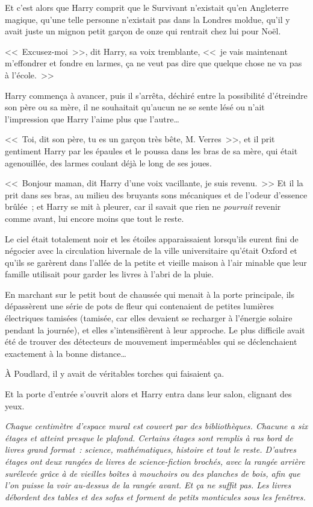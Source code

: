 Et c'est alors que Harry comprit que le Survivant n'existait qu'en Angleterre magique, qu'une telle personne n'existait pas dans la Londres moldue, qu'il y avait juste un mignon petit garçon de onze qui rentrait chez lui pour Noël.

<<~Excusez-moi~>>, dit Harry, sa voix tremblante, <<~je vais maintenant m'effondrer et fondre en larmes, ça ne veut pas dire que quelque chose ne va pas à l'école.~>>

Harry commença à avancer, puis il s'arrêta, déchiré entre la possibilité d'étreindre son père ou sa mère, il ne souhaitait qu'aucun ne se sente lésé ou n'ait l'impression que Harry l'aime plus que l'autre…

<<~Toi, dit son père, tu es un garçon très bête, M. Verres~>>, et il prit gentiment Harry par les épaules et le poussa dans les bras de sa mère, qui était agenouillée, des larmes coulant déjà le long de ses joues.

<<~Bonjour maman, dit Harry d'une voix vacillante, je suis revenu.~>> Et il la prit dans ses bras, au milieu des bruyants sons mécaniques et de l'odeur d'essence brûlée~; et Harry se mit à pleurer, car il savait que rien ne \emph{pourrait} revenir comme avant, lui encore moins que tout le reste.

\later

Le ciel était totalement noir et les étoiles apparaissaient lorsqu'ils eurent fini de négocier avec la circulation hivernale de la ville universitaire qu'était Oxford et qu'ils se garèrent dans l'allée de la petite et vieille maison à l'air minable que leur famille utilisait pour garder les livres à l'abri de la pluie.

En marchant sur le petit bout de chaussée qui menait à la porte principale, ils dépassèrent une série de pots de fleur qui contenaient de petites lumières électriques tamisées (tamisée, car elles devaient se recharger à l'énergie solaire pendant la journée), et elles s'intensifièrent à leur approche. Le plus difficile avait été de trouver des détecteurs de mouvement imperméables qui se déclenchaient exactement à la bonne distance…

À Poudlard, il y avait de véritables torches qui faisaient ça.

Et la porte d'entrée s'ouvrit alors et Harry entra dans leur salon, clignant des yeux.

\emph{Chaque centimètre d'espace mural est couvert par des bibliothèques. Chacune a six étages et atteint presque le plafond. Certains étages sont remplis à ras bord de livres grand format~: science, mathématiques, histoire et tout le reste. D'autres étages ont deux rangées de livres de science-fiction brochés, avec la rangée arrière surélevée grâce à de vieilles boîtes à mouchoirs ou des planches de bois, afin que l'on puisse la voir au-dessus de la rangée avant. Et ça ne suffit pas. Les livres débordent des tables et des sofas et forment de petits monticules sous les fenêtres.}

